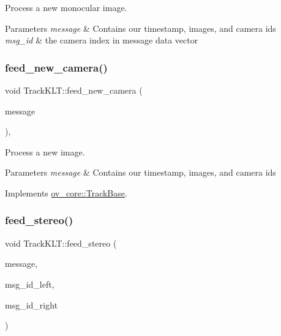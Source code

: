 Process a new monocular image. 


\begin{DoxyParams}{Parameters}
{\em message} & Contains our timestamp, images, and camera ids \\
\hline
{\em msg\+\_\+id} & the camera index in message data vector \\
\hline
\end{DoxyParams}
\mbox{\label{classov__core_1_1TrackKLT_a8cb9c3595fbbddc9a563137cd06b07cf}} 
\subsubsection{\texorpdfstring{feed\+\_\+new\+\_\+camera()}{feed\_new\_camera()}}
{\footnotesize\ttfamily void Track\+K\+L\+T\+::feed\+\_\+new\+\_\+camera (\begin{DoxyParamCaption}\item[{const \hyperlink{structov__core_1_1CameraData}{Camera\+Data} \&}]{message }\end{DoxyParamCaption})\hspace{0.3cm}{\ttfamily [override]}, {\ttfamily [virtual]}}



Process a new image. 


\begin{DoxyParams}{Parameters}
{\em message} & Contains our timestamp, images, and camera ids \\
\hline
\end{DoxyParams}


Implements \hyperlink{classov__core_1_1TrackBase_a18f208f4047e9a1955406806ba68a8c1}{ov\+\_\+core\+::\+Track\+Base}.

\mbox{\label{classov__core_1_1TrackKLT_a7e0f2b1990992ed7dbd916732dd9d7a9}} 
\subsubsection{\texorpdfstring{feed\+\_\+stereo()}{feed\_stereo()}}
{\footnotesize\ttfamily void Track\+K\+L\+T\+::feed\+\_\+stereo (\begin{DoxyParamCaption}\item[{const \hyperlink{structov__core_1_1CameraData}{Camera\+Data} \&}]{message,  }\item[{size\+\_\+t}]{msg\+\_\+id\+\_\+left,  }\item[{size\+\_\+t}]{msg\+\_\+id\+\_\+right }\end{DoxyParamCaption})\hspace{0.3cm}{\ttfamily [protected]}}



